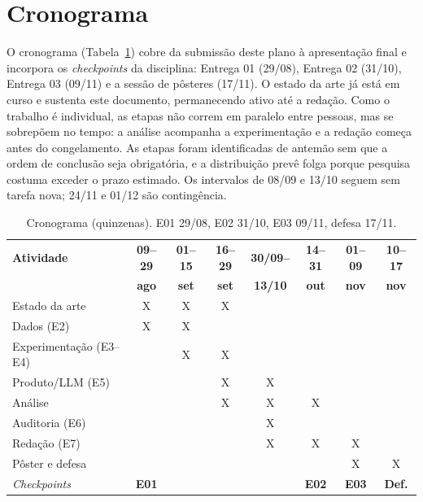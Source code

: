 \documentclass[conference]{IEEEtran}
\begin{document}
\section{Cronograma}
\label{sec:crono}

O cronograma (Tabela~\ref{tab:crono}) cobre da submissão deste plano à
apresentação final e incorpora os \emph{checkpoints} da disciplina: Entrega 01
(29/08), Entrega 02 (31/10), Entrega 03 (09/11) e a sessão de pôsteres (17/11).
O estado da arte já está em curso e sustenta este documento, permanecendo ativo
até a redação. Como o trabalho é individual, as etapas não correm em paralelo
entre pessoas, mas se sobrepõem no tempo: a análise acompanha a experimentação e
a redação começa antes do congelamento. As etapas foram identificadas de antemão
sem que a ordem de conclusão seja obrigatória, e a distribuição prevê folga
porque pesquisa costuma exceder o prazo estimado. Os intervalos de 08/09 e 13/10
seguem sem tarefa nova; 24/11 e 01/12 são contingência.

\begin{table}[!h]
\caption{Cronograma (quinzenas). E01 29/08, E02 31/10, E03 09/11, defesa 17/11.}
\label{tab:crono}
\centering
\renewcommand{\arraystretch}{1.0}
\setlength{\tabcolsep}{2.6pt}
\scriptsize
\begin{tabular}{@{}>{\raggedright\arraybackslash}p{1.95cm}ccccccc@{}}
\toprule
\textbf{Atividade} & \textbf{09--29} & \textbf{01--15} & \textbf{16--29} &
\textbf{30/09--} & \textbf{14--31} & \textbf{01--09} & \textbf{10--17} \\
 & \textbf{ago} & \textbf{set} & \textbf{set} & \textbf{13/10} &
\textbf{out} & \textbf{nov} & \textbf{nov} \\
\midrule
Estado da arte          & X & X & X &   &   &   &   \\
Dados (E2)              & X & X &   &   &   &   &   \\
Experimentação (E3--E4) &   & X & X &   &   &   &   \\
Produto/LLM (E5)        &   &   & X & X &   &   &   \\
Análise                 &   &   & X & X & X &   &   \\
Auditoria (E6)          &   &   &   & X &   &   &   \\
Redação (E7)            &   &   &   & X & X & X &   \\
Pôster e defesa         &   &   &   &   &   & X & X \\
\midrule
\textit{Checkpoints} & \textbf{E01} & & & & \textbf{E02} & \textbf{E03} & \textbf{Def.} \\
\bottomrule
\end{tabular}
\end{table}
\end{document}
